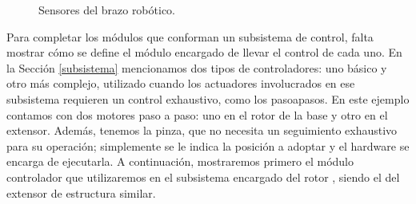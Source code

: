 \begin{figure}[h]
\caption{Sensores del brazo robótico.}
\label{sensores}
\begin{center}
\end{center}
\end{figure}

Para completar los módulos que conforman un subsistema de control, falta mostrar cómo se define el módulo encargado de llevar el control de cada uno. En la Sección \ref{subsistema} mencionamos dos tipos de controladores: uno básico y otro más complejo, utilizado cuando los actuadores involucrados en ese subsistema requieren un control exhaustivo, como los \glspl{pasoapaso}. En este ejemplo contamos con dos motores paso a paso: uno en el rotor de la base y otro en el extensor. Además, tenemos la pinza, que no necesita un seguimiento exhaustivo para su operación; simplemente se le indica la posición a adoptar y el hardware se encarga de ejecutarla. A continuación, mostraremos primero el módulo controlador que utilizaremos en el subsistema encargado del rotor \RotorCtrl, siendo el del extensor de estructura similar.

